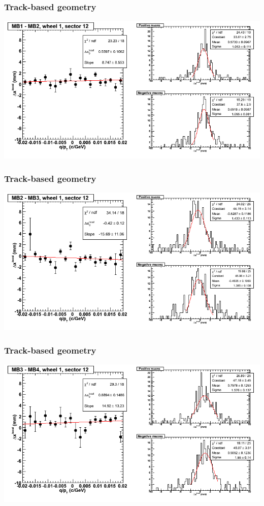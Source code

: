 \documentclass[compress]{beamer}
\begin{document}
\begin{frame}
\frametitle{Track-based geometry}
\includegraphics[width=\linewidth]{NOV4_segdiffs/dt13_resid_D_12_12.png}
\end{frame}

\begin{frame}
\frametitle{Track-based geometry}
\includegraphics[width=\linewidth]{NOV4_segdiffs/dt13_resid_D_12_23.png}
\end{frame}

\begin{frame}
\frametitle{Track-based geometry}
\includegraphics[width=\linewidth]{NOV4_segdiffs/dt13_resid_D_12_34.png}
\end{frame}
\end{document}
